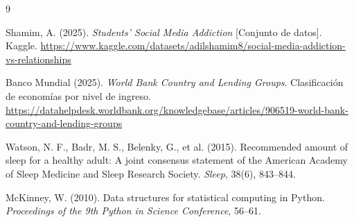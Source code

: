\begin{thebibliography}{9}
\small

Shamim, A. (2025). \textit{Students' Social Media Addiction} [Conjunto de datos]. Kaggle.
\url{https://www.kaggle.com/datasets/adilshamim8/social-media-addiction-vs-relationships}

Banco Mundial (2025). \textit{World Bank Country and Lending Groups}. Clasificación de economías por
nivel de ingreso.
\url{https://datahelpdesk.worldbank.org/knowledgebase/articles/906519-world-bank-country-and-lending-groups}

Watson, N. F., Badr, M. S., Belenky, G., et al. (2015). Recommended amount of sleep for a healthy adult:
A joint consensus statement of the American Academy of Sleep Medicine and Sleep Research Society.
\textit{Sleep}, 38(6), 843--844.

McKinney, W. (2010). Data structures for statistical computing in Python. \textit{Proceedings of the 9th
Python in Science Conference}, 56--61.

\end{thebibliography}
